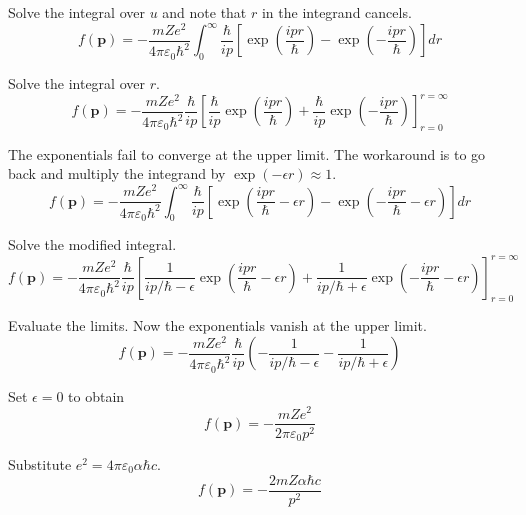 Solve the integral over $u$ and note that $r$ in the integrand cancels.
\begin{equation*}
f(\mathbf p)=-\frac{mZe^2}{4\pi\varepsilon_0\hbar^2}
\int_0^\infty
\frac{\hbar}{ip}
\left[\exp\left(\frac{ipr}{\hbar}\right)-\exp\left(-\frac{ipr}{\hbar}\right)\right]
dr
\end{equation*}

Solve the integral over $r$.
\begin{equation*}
f(\mathbf p)
=-\frac{mZe^2}{4\pi\varepsilon_0\hbar^2}\frac{\hbar}{ip}
\left[
\frac{\hbar}{ip}
\exp\left(\frac{ipr}{\hbar}\right)
+\frac{\hbar}{ip}
\exp\left(-\frac{ipr}{\hbar}\right)
\right]_{r=0}^{r=\infty}
\end{equation*}

The exponentials fail to converge at the upper limit.
The workaround is to go back and multiply the integrand by $\exp(-\epsilon r)\approx1$.
\begin{equation*}
f(\mathbf p)=-\frac{mZe^2}{4\pi\varepsilon_0\hbar^2}
\int_0^\infty
\frac{\hbar}{ip}
\left[\exp\left(\frac{ipr}{\hbar}-\epsilon r\right)
-\exp\left(-\frac{ipr}{\hbar}-\epsilon r\right)\right]
dr
\end{equation*}

Solve the modified integral.
\begin{equation*}
f(\mathbf p)=-\frac{mZe^2}{4\pi\varepsilon_0\hbar^2}
\frac{\hbar}{ip}
\left[
\frac{1}{ip/\hbar-\epsilon}\exp\left(\frac{ipr}{\hbar}-\epsilon r\right)
+\frac{1}{ip/\hbar+\epsilon}\exp\left(-\frac{ipr}{\hbar}-\epsilon r\right)
\right]_{r=0}^{r=\infty}
\end{equation*}

Evaluate the limits. Now the exponentials vanish at the upper limit.
\begin{equation*}
f(\mathbf p)=-\frac{mZe^2}{4\pi\varepsilon_0\hbar^2}
\frac{\hbar}{ip}
\left(-\frac{1}{ip/\hbar-\epsilon}-\frac{1}{ip/\hbar+\epsilon}\right)
\tag{1}
\end{equation*}

Set $\epsilon=0$ to obtain
\begin{equation*}
f(\mathbf p)=-\frac{mZe^2}{2\pi\varepsilon_0p^2}
\end{equation*}

Substitute $e^2=4\pi\varepsilon_0\alpha\hbar c$.
\begin{equation*}
f(\mathbf p)=-\frac{2mZ\alpha\hbar c}{p^2}
\end{equation*}

